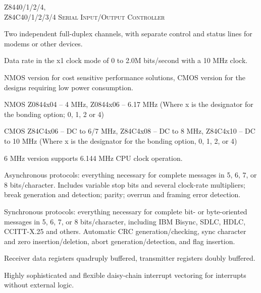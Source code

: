 \documentclass[10pt,twoside]{article}
\begin{document}
\setcounter{page}{99}

         {Z8440/1/2/4,\\Z84C40/1/2/3/4}
         {{\scshape Serial Input/Output Controller}}

\dsrule
{}

\begin{dscols}
\begin{featlist}
\item Two independent full-duplex channels, with separate control and status
      lines for modems or other devices.
\item Data rate in the x1 clock mode of 0 to 2.0M bits/second with a
      10 MHz clock.
\item NMOS version for cost sensitive performance solutions, CMOS version
      for the designs requiring low power consumption.
\item NMOS Z0844x04 -- 4 MHz, Z0844x06 -- 6.17 MHz (Where x is the designator
      for the bonding option; 0, 1, 2 or 4)
\item CMOS Z84C4x06 -- DC to 6/7 MHz, Z84C4x08 -- DC to 8 MHz, Z84C4x10 --
      DC to 10 MHz (Where x is the designator for the bonding option,
      0, 1, 2, or 4)
\item 6 MHz version supports 6.144 MHz CPU clock operation.
\end{featlist}

\columnbreak

\begin{featlist}
\item Asynchronous protocols: everything necessary for complete messages in
      5, 6, 7, or 8 bits/character. Includes variable stop bits and several
      clock-rate multipliers; break generation and detection; parity; overrun
      and framing error detection.
\item Synchronous protocols: everything necessary for complete bit- or
      byte-oriented messages in 5, 6, 7, or 8 bits/character, including IBM
      Bisync, SDLC, HDLC, CCITT-X.25 and others. Automatic CRC
      generation/checking, sync character and zero insertion/deletion, abort
      generation/detection, and flag insertion.
\item Receiver data registers quadruply buffered, transmitter registers doubly
      buffered.
\item Highly sophisticated and flexible daisy-chain interrupt vectoring for
      interrupts without external logic.
\end{featlist}
\end{dscols}
\end{document}
